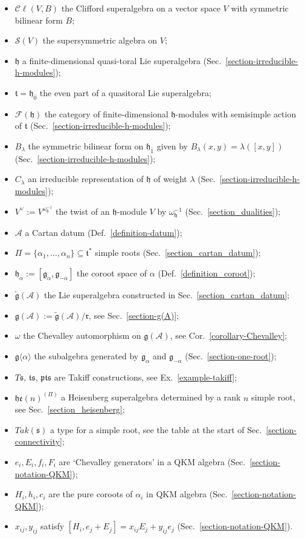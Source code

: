 \documentclass[12pt, a4paper, reqno]{amsart}
\def\AA{\mathcal{A}}
\def\FF{\mathcal{F}}
\def\SS{\mathcal{S}}
\def\CC{\mathcal{C}}
\def\e{\mathfrak{e}}
\def\g{\mathfrak{g}}
\def\h{\mathfrak{h}}
\def\r{\mathfrak{r}}
\def\s{\mathfrak{s}}
\def\ol{\overline}
\theoremstyle{definition}
\theoremstyle{definition}
\theoremstyle{definition}
\numberwithin{theorem}{section}
\numberwithin{lemma}{section}
\numberwithin{remark}{section}
\numberwithin{definition}{section}
\numberwithin{corollary}{section}
\numberwithin{proposition}{section}
\numberwithin{example}{section}
\begin{document}
	\begin{itemize}
		\item $\CC\ell(V,B)$ the Clifford superalgebra on a vector space $V$ with symmetric bilinear form $B$;
		\item $\SS(V)$ the supersymmetric algebra on $V$;
		\item $\h$ a finite-dimensional quasi-toral Lie superalgebra (Sec.~\ref{section-irreducible-h-modules});
		\item $\mathfrak{t}=\h_{\ol{0}}$ the even part of a quasitoral Lie superalgebra;
		\item $\FF(\h)$ the category of finite-dimensional $\h$-modules with semisimple action of $\mathfrak{t}$ (Sec.~\ref{section-irreducible-h-modules});
		\item $B_{\lambda}$ the symmetric bilinear form on $\h_{\ol{1}}$ given by $B_{\lambda}(x,y)=\lambda([x,y])$ (Sec.~\ref{section-irreducible-h-modules});
		\item $C_{\lambda}$ an irreducible representation of $\h$ of weight $\lambda$ (Sec.~\ref{section-irreducible-h-modules});
		\item $V^\vee:=V^{\omega_{\h}^{-1}}$ the twist of an $\h$-module $V$ by $\omega_{\h}^{-1}$ (Sec.~\ref{section_dualities});
		\item $\AA$ a Cartan datum (Def.~\ref{definition-datum});
		\item $\Pi=\{\alpha_1,\dots,\alpha_n\}\subseteq\mathfrak{t}^*$ simple roots (Sec.~\ref{section_cartan_datum});
		\item $\h_{\alpha}:=[\g_{\alpha},\g_{-\alpha}]$ the coroot space of $\alpha$ (Def.~\ref{definition_coroot});
		\item $\tilde{\g}(\AA)$ the Lie superalgebra constructed in Sec.~\ref{section_cartan_datum};
		\item $\g(\AA):=\tilde{\g}(\AA)/\r$, see Sec.~\ref{section-g(A)};
		\item $\omega$ the Chevalley automorphism on $\g(\AA)$, see Cor.~\ref{corollary-Chevalley};
		\item $\g\langle\alpha\rangle$ the subalgebra generated by $\g_{\alpha}$ and $\g_{-\alpha}$ (Sec.~\ref{section-one-root});
		\item $T\s$, $\mathfrak{t}\s$, $\mathfrak{pt}\s$ are Takiff constructions, see Ex.~\ref{example-takiff};
		\item $\h\e(n)^{(\Pi)}$ a Heisenberg superalgebra determined by a rank $n$ simple root, see Sec.~\ref{section_heisenberg};
		\item $Tak(\s)$ a type for a simple root, see the table at the start of Sec.~\ref{section-connectivity};
		\item $e_i,E_i,f_i,F_i$ are `Chevalley generators' in a QKM algebra (Sec.~\ref{section-notation-QKM});
		\item $H_i,h_i,c_i$ are the pure coroots of $\alpha_i$ in QKM algebra (Sec.~\ref{section-notation-QKM});
		\item $x_{ij},y_{ij}$ satisfy $[H_i,e_j+E_j]=x_{ij}E_j+y_{ij}e_j$ (Sec.~\ref{section-notation-QKM}).
	\end{itemize}
	
\end{document}
